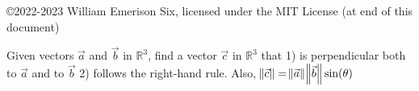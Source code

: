 \documentclass[12pt]{article}
\newcommand{\R}{\mathbb{R}}
\newenvironment{problem}[2][Problem]{\begin{trivlist}
\item[\hskip \labelsep {\bfseries #1}\hskip \labelsep {\bfseries #2.}]}{\end{trivlist}}
\begin{document}

\rhead{\today}


\copyright 2022-2023 William Emerison Six, licensed under the MIT License (at end of this document)

\renewcommand{\arraystretch}{2.0}
\setlength{\arraycolsep}{0.5cm}

\begin{problem}{1} %

  Given vectors $\vec{a}$ and $\vec{b}$ in $\R^3$, find a vector $\vec{c}$ in $\R^3$ that 1) is perpendicular both to $\vec{a}$ and to $\vec{b}$
  2) follows the right-hand rule.  Also, $\norm{\vec{c}} = \norm{\vec{a}}\norm{\vec{b}}\sin(\theta) $
\end{problem}
\end{document}
